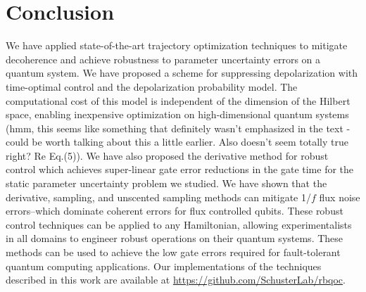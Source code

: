\section{Conclusion}
We have applied state-of-the-art trajectory
optimization techniques to mitigate decoherence and
achieve robustness to parameter uncertainty
errors on a quantum system.
We have proposed a scheme for suppressing
depolarization with time-optimal
control and the depolarization probability model.
The computational cost of this model is
independent of the dimension of the Hilbert space, enabling
inexpensive optimization on high-dimensional quantum systems (hmm, this seems like something that definitely wasn't emphasized in the text - could be worth talking about this a little earlier. Also doesn't seem totally true right? Re Eq.(5)).
We have also proposed the derivative method for robust control which achieves
super-linear gate error reductions in the gate time for the static parameter
uncertainty problem we studied.
We have shown that the derivative, sampling, and unscented sampling methods
can mitigate 1/$f$ flux noise errors--which
dominate coherent errors for flux controlled qubits.
These robust control techniques can be applied
to any Hamiltonian,
allowing experimentalists in all domains to engineer robust
operations on their quantum systems.
These methods can be used to achieve the low gate errors
required for fault-tolerant quantum computing applications. Our
implementations of the techniques described in this work are available
at \url{https://github.com/SchusterLab/rbqoc}. 
